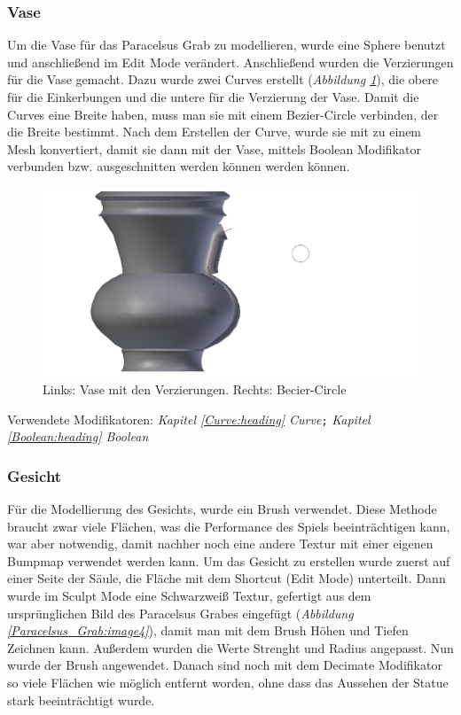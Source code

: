 \subsubsection{Vase}
Um die Vase für das Paracelsus Grab zu modellieren, wurde eine Sphere benutzt und anschließend im Edit Mode verändert. Anschließend wurden die Verzierungen für die Vase gemacht.
Dazu wurde zwei Curves erstellt (\textit{Abbildung \ref{Paracelsus_Grab:image5}}), die obere für die Einkerbungen und die untere für die Verzierung der Vase. Damit die Curves eine
Breite haben, muss man sie mit einem Bezier-Circle verbinden, der die Breite bestimmt. Nach dem Erstellen der Curve,
wurde sie mit  zu einem Mesh konvertiert, damit sie dann mit der Vase, mittels Boolean Modifikator verbunden
bzw. ausgeschnitten werden können werden können.

\begin{figure}[H]
    \centering
    \includegraphics[width=.8\textwidth]{images/Paracelsus-Grab_Vase-Curve.png}
    \caption{Links: Vase mit den Verzierungen. Rechts: Becier-Circle}
    \label{Paracelsus_Grab:image5}
\end{figure}

Verwendete Modifikatoren: \textit{Kapitel \ref{Curve:heading} \dq Curve\dq}\verb+;+ \textit{Kapitel \ref{Boolean:heading} \dq Boolean\dq}

\subsubsection{Gesicht}
Für die Modellierung des Gesichts, wurde ein Brush verwendet. Diese Methode braucht zwar viele Flächen, was die Performance des Spiels beeinträchtigen kann, war
aber notwendig, damit nachher noch eine andere Textur mit einer eigenen Bumpmap verwendet werden kann. Um das Gesicht zu erstellen wurde zuerst auf einer Seite der Säule,
die Fläche mit dem Shortcut   (Edit Mode) unterteilt. Dann wurde im Sculpt Mode eine Schwarzweiß Textur, gefertigt aus dem ursprünglichen Bild des Paracelsus Grabes
eingefügt (\textit{Abbildung \ref{Paracelsus_Grab:image4}}),
damit man mit dem Brush Höhen und Tiefen Zeichnen kann. Außerdem wurden die Werte Strenght und Radius angepasst. Nun wurde der Brush angewendet. Danach sind noch mit dem
Decimate Modifikator so viele Flächen wie möglich entfernt worden, ohne dass das Aussehen der Statue stark beeinträchtigt wurde.

